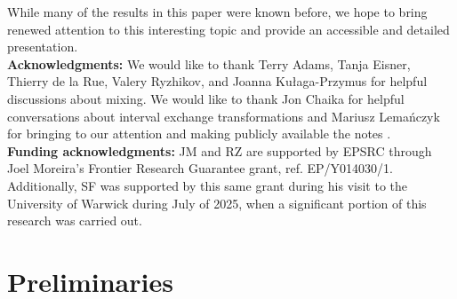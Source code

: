 \documentclass[graybox]{svmult}
\theoremstyle{definition}
\begin{document}
While many of the results in this paper were known before, we hope to bring renewed attention to this interesting topic and provide an accessible and detailed presentation.\\

\textbf{Acknowledgments:} %
We would like to thank Terry Adams, Tanja Eisner, Thierry de la Rue, Valery Ryzhikov, and Joanna Ku\l aga-Przymus for helpful discussions about mixing.
We would like to thank Jon Chaika for helpful conversations about interval exchange transformations and Mariusz Lema\'nczyk for bringing to our attention and making publicly available the notes \cite{Lemanczyk_IET,Lemanczyk_Parreau}.  \\

\textbf{Funding acknowledgments:} JM and RZ are supported by EPSRC through Joel Moreira's Frontier Research Guarantee grant, ref. EP/Y014030/1. Additionally, SF was supported by this same grant during his visit to the University of Warwick during July of 2025, when a significant portion of this research was carried out.

\section{Preliminaries}\label{sec:Preliminaries}
\end{document}

